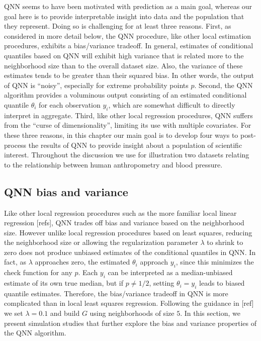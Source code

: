 QNN seems to have been motivated with prediction as a main goal,
whereas our goal here is to provide interpretable insight into data
and the population that they represent.  Doing so is challenging for
at least three reasons.  First, as considered in more detail below,
the QNN procedure, like other local estimation procedures, exhibits
a bias/variance tradeoff.  In general, estimates of conditional
quantiles based on QNN will exhibit high variance that is related more
to the neighborhood size than to the overall dataset size.  Also, the
variance of these estimates tends to be greater than their squared bias.
In other words, the output of QNN is ``noisy'', especially for extreme
probability points $p$.  Second, the QNN algorithm provides a voluminous
output consisting of an estimated conditional quantile $\theta_i$
for each observation $y_i$, which are somewhat difficult to directly
interpret in aggregate.  Third, like other local regression procedures,
QNN suffers from the ``curse of dimensionality'', limiting its use
with multiple covariates.  For these three reasons, in this chapter
our main goal is to develop four ways to post-process the results
of QNN to provide insight about a population of scientific interest.
Throughout the discussion we use for illustration two datasets relating
to the relationship between human anthropometry and blood pressure.

\subsection{QNN bias and variance}

Like other local regression procedures such as the more familiar local
linear regression [refs], QNN trades off bias and variance based on
the neighborhood size.  However unlike local regression procedures
based on least squares, reducing the neighborhood size or allowing the
regularization parameter $\lambda$ to shrink to zero does not produce
unbiased estimates of the conditional quantiles in QNN.  In fact, as
$\lambda$ approaches zero, the estimated $\theta_i$ approach $y_i$,
since this minimizes the check function for any $p$.  Each $y_i$ can be
interpreted as a median-unbiased estimate of its own true median, but if
$p\ne 1/2$, setting $\theta_i = y_i$ leads to biased quantile estimates.
Therefore, the bias/variance tradeoff in QNN is more complicated than
in local least squares regression.  Following the guidance in [ref]
we set $\lambda=0.1$ and build $G$ using neighborhoods of size $5$.
In this section, we present simulation studies that further explore the
bias and variance properties of the QNN algorithm.


